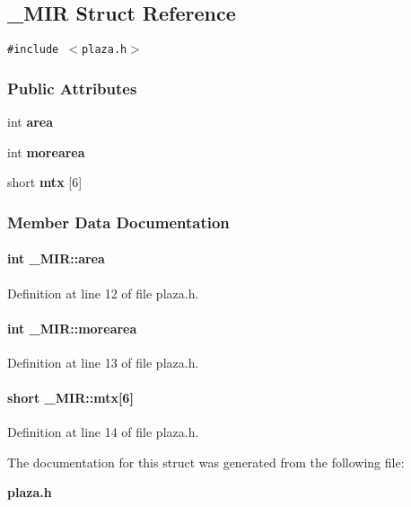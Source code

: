 \subsection{\_\-MIR  Struct Reference}
\label{_MIR}
{\tt \#include $<$plaza.h$>$}

\subsubsection*{Public Attributes}
\begin{CompactItemize}
\item 
int {\bf area}
\item 
int {\bf morearea}
\item 
short {\bf mtx} [6]
\end{CompactItemize}


\subsubsection{Member Data Documentation}
\label{_MIR_m0}
\paragraph{\setlength{\rightskip}{0pt plus 5cm}int \_\-MIR::area}\hfill



Definition at line 12 of file plaza.h.\label{_MIR_m1}
\paragraph{\setlength{\rightskip}{0pt plus 5cm}int \_\-MIR::morearea}\hfill



Definition at line 13 of file plaza.h.\label{_MIR_m2}
\paragraph{\setlength{\rightskip}{0pt plus 5cm}short \_\-MIR::mtx[6]}\hfill



Definition at line 14 of file plaza.h.

The documentation for this struct was generated from the following file:\begin{CompactItemize}
\item 
{\bf plaza.h}\end{CompactItemize}
